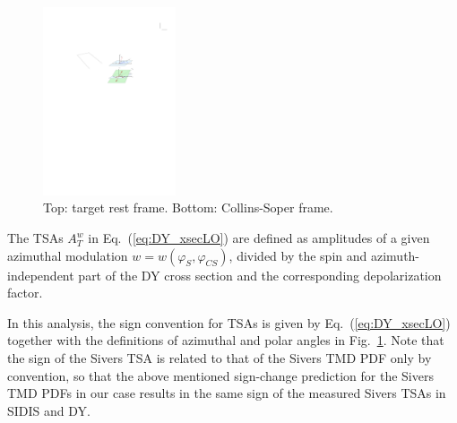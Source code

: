 \documentclass[a4paper,manyauthors,nocleardouble,COMPASS]{cernphprep}
\newcommand{\phiCS}{\varphi _{CS}}
\newcommand{\phiS}{\varphi _S}
\begin{document}
\begin{figure}[bp]
\centering
\includegraphics[width=0.35\textwidth]{plots/DY_framework2.pdf}
\caption{Top: target rest frame.
Bottom: Collins-Soper frame.
%
}
\label{fig:DYframe}
\end{figure}
%

The TSAs $A_{T}^{w}$ in Eq.~(\ref{eq:DY_xsecLO}) are defined as amplitudes of a given azimuthal modulation $w=w(\phiS,\phiCS)$, divided by the spin and azimuth-independent part of the DY cross section and the corresponding depolarization factor.

In this analysis, the sign convention for TSAs is given by Eq.~(\ref{eq:DY_xsecLO}) together with the definitions of azimuthal and polar angles in Fig.~\ref{fig:DYframe}.
Note that the sign of the Sivers TSA is related to that of the Sivers TMD PDF only by convention, so that the above mentioned sign-change prediction for the Sivers TMD PDFs in our case results in the same sign of the measured Sivers TSAs in SIDIS and DY.
\end{document}
